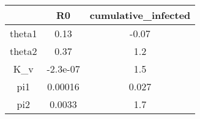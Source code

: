 \begin{tabular}{|c|c|c|}
\hline
& R0 & cumulative_infected \\
\hline
theta1 & 0.13 & -0.07 \\
\hline
theta2 & 0.37 & 1.2 \\
\hline
K_v & -2.3e-07 & 1.5 \\
\hline
pi1 & 0.00016 & 0.027 \\
\hline
pi2 & 0.0033 & 1.7 \\
\hline
\end{tabular}

